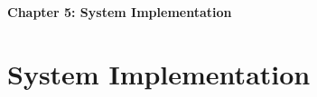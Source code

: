 \cleardoublepage %
\thispagestyle{plain} %

\vspace*{\fill}
\begin{center}
    {\Huge\bfseries Chapter 5: System Implementation \par}
    \vspace{1cm}
\end{center}
\vspace*{\fill}

\clearpage %


\chapter{System Implementation}
\label{chap:system_implementation}








